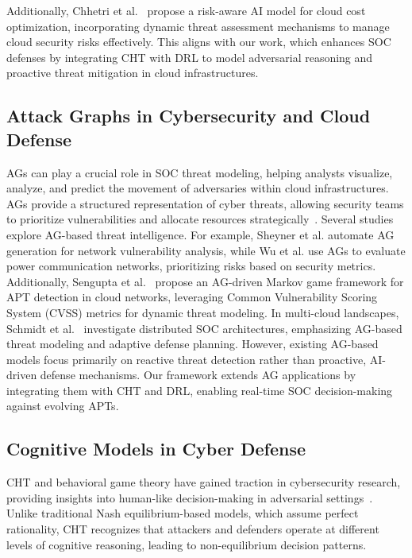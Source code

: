 Additionally, Chhetri et al.~\cite{chhetri2023riskaware} propose a risk-aware AI model for cloud cost optimization, incorporating dynamic threat assessment mechanisms to manage cloud security risks effectively. This aligns with our work, which enhances SOC defenses by integrating CHT with DRL to model adversarial reasoning and proactive threat mitigation in cloud infrastructures.

\subsection{Attack Graphs in Cybersecurity and Cloud Defense}
AGs can play a crucial role in SOC threat modeling, helping analysts visualize, analyze, and predict the movement of adversaries within cloud infrastructures. AGs provide a structured representation of cyber threats, allowing security teams to prioritize vulnerabilities and allocate resources strategically~\cite{wang2008attack, nadeem2021sage, ibrahim2019attack}.
Several studies explore AG-based threat intelligence. For example, Sheyner et al.\cite{sheyner2002automated} automate AG generation for network vulnerability analysis, while Wu et al.\cite{wu2022research} use AGs to evaluate power communication networks, prioritizing risks based on security metrics. Additionally, Sengupta et al.~\cite{sengupta2019general} propose an AG-driven Markov game framework for APT detection in cloud networks, leveraging Common Vulnerability Scoring System (CVSS) metrics for dynamic threat modeling.
In multi-cloud landscapes, Schmidt et al.~\cite{schmidt2023distributedSOC} investigate distributed SOC architectures, emphasizing AG-based threat modeling and adaptive defense planning. However, existing AG-based models focus primarily on reactive threat detection rather than proactive, AI-driven defense mechanisms. Our framework extends AG applications by integrating them with CHT and DRL, enabling real-time SOC decision-making against evolving APTs.

\subsection{Cognitive Models in Cyber Defense}
CHT and behavioral game theory have gained traction in cybersecurity research, providing insights into human-like decision-making in adversarial settings~\cite{camerer2004cognitive, kleiman2016coordinate}. Unlike traditional Nash equilibrium-based models, which assume perfect rationality, CHT recognizes that attackers and defenders operate at different levels of cognitive reasoning, leading to non-equilibrium decision patterns.

